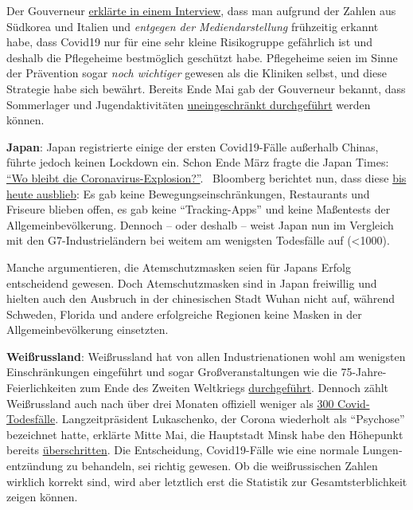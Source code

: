 Der Gouverneur
\href{https://www.nationalreview.com/2020/05/coronavirus-crisis-ron-desantis-florida-covid-19-strategy/}{erklärte
in einem Interview}, dass man aufgrund der Zahlen aus Südkorea und
Italien und \emph{entgegen der Mediendarstellung} frühzeitig erkannt
habe, dass Covid19 nur für eine sehr kleine Risikogruppe gefährlich ist
und deshalb die Pflegeheime bestmöglich geschützt habe. Pflegeheime
seien im Sinne der Prävention sogar \emph{noch wichtiger} gewesen als
die Kliniken selbst, und diese Strategie habe sich bewährt. Bereits Ende
Mai gab der Gouverneur bekannt, dass Sommerlager und Jugendaktivitäten
\href{https://www.usnews.com/news/best-states/florida/articles/2020-05-22/miami-beach-officials-agree-to-reopen-hotels-beaches-june-1}{uneingeschränkt
durchgeführt} werden können.

\textbf{Japan}: Japan registrierte einige der ersten Covid19-Fälle
außerhalb Chinas, führte jedoch keinen Lockdown ein. Schon Ende März
fragte die Japan Times:
\href{https://www.japantimes.co.jp/news/2020/03/20/national/coronavirus-explosion-expected-japan/}{``Wo
bleibt die Coronavirus-Explosion?''}.~ Bloomberg berichtet nun, dass
diese
\href{https://www.bloomberg.com/news/articles/2020-05-22/did-japan-just-beat-the-virus-without-lockdowns-or-mass-testing}{bis
heute ausblieb}: Es gab keine Bewegungseinschränkungen, Restaurants und
Friseure blieben offen, es gab keine ``Tracking-Apps'' und keine
Maßentests der Allgemeinbevölkerung. Dennoch -- oder deshalb -- weist
Japan nun im Vergleich mit den G7-Industrieländern bei weitem am
wenigsten Todesfälle auf (\textless{}1000).

Manche argumentieren, die Atemschutzmasken seien für Japans Erfolg
entscheidend gewesen. Doch Atemschutzmasken sind in Japan freiwillig und
hielten auch den Ausbruch in der chinesischen Stadt Wuhan nicht auf,
während Schweden, Florida und andere erfolgreiche Regionen keine Masken
in der Allgemeinbevölkerung einsetzten.

\textbf{Weißrussland}: Weißrussland hat von allen Industrienationen wohl
am wenigsten Einschränkungen eingeführt und sogar Großveranstaltungen
wie die 75-Jahre-Feierlichkeiten zum Ende des Zweiten Weltkriegs
\href{https://www.youtube.com/watch?v=NZliKGoUN4E}{durchgeführt}.
Dennoch zählt Weißrussland auch nach über drei Monaten offiziell weniger
als
\href{https://en.wikipedia.org/wiki/COVID-19_pandemic_in_Belarus}{300
Covid-Todesfälle}. Langzeitpräsident Lukaschenko, der Corona wiederholt
als ``Psychose'' bezeichnet hatte, erklärte Mitte Mai, die Hauptstadt
Minsk habe den Höhepunkt bereits
\href{https://eng.belta.by/president/view/belarus-president-coronavirus-situation-on-the-mend-130571-2020/}{überschritten}.
Die Entscheidung, Covid19-Fälle wie eine normale Lungen­ent­zündung zu
behandeln, sei richtig gewesen. Ob die weißrussischen Zahlen wirklich
korrekt sind, wird aber letztlich erst die Statistik zur
Gesamtsterblichkeit zeigen können.

